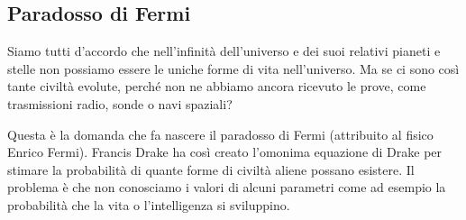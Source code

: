 \documentclass[12pt]{book} %
\begin{document}
\subsection{Paradosso di Fermi}
Siamo tutti d'accordo che nell'infinità dell'universo e
dei suoi relativi pianeti e stelle non possiamo essere le uniche forme di vita nell'universo. Ma
se ci sono così tante civiltà evolute, perché non ne abbiamo ancora ricevuto le prove, come trasmissioni radio, sonde o
navi spaziali?

Questa è la domanda che fa nascere il paradosso di Fermi (attribuito al fisico Enrico
Fermi). Francis
Drake ha così creato l'omonima equazione di Drake per stimare la probabilità di quante forme di
civiltà aliene possano esistere. Il problema è che non conosciamo i valori di alcuni parametri come ad esempio la
probabilità che la vita o l'intelligenza si sviluppino.
\end{document}
